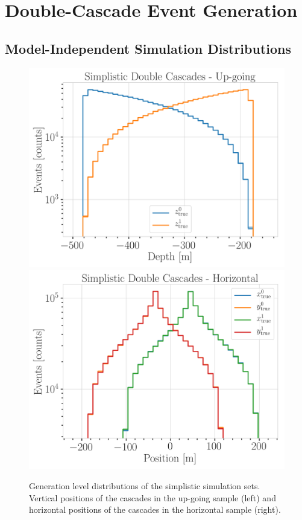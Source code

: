 \chapter{Double-Cascade Event Generation}


\section{Model-Independent Simulation Distributions} 

\begin{figure}[h]
    \centering
    \includegraphics[width=0.49\linewidth]{figures/model_independent_simulation/gen_level/up_going_simplistic_1_d_distr_depth.png}
    \includegraphics[width=0.49\linewidth]{figures/model_independent_simulation/gen_level/horizontal_simplistic_1_d_distr_position.png}
    \caption[Simplified model independent simulation generation level distributions]{Generation level distributions of the simplistic simulation sets. Vertical positions of the cascades in the up-going sample (left) and horizontal positions of the cascades in the horizontal sample (right).}
\end{figure}

